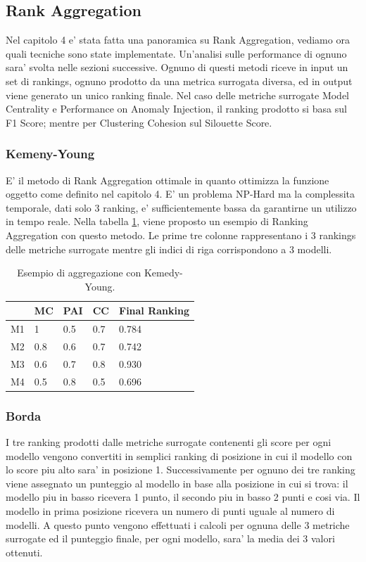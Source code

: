 \subsection{Rank Aggregation}
Nel capitolo 4 e' stata fatta una panoramica su Rank Aggregation, vediamo ora quali tecniche sono state implementate. Un'analisi sulle performance di ognuno sara' svolta nelle sezioni successive.
Ognuno di questi metodi riceve in input un set di rankings, ognuno prodotto da una metrica surrogata diversa, ed in output viene generato un unico ranking finale.
Nel caso delle metriche surrogate Model Centrality e Performance on Anomaly Injection, il ranking prodotto si basa sul F1 Score; mentre per Clustering Cohesion sul Silouette Score.
\subsubsection{Kemeny-Young}
E' il metodo di Rank Aggregation ottimale in quanto ottimizza la funzione oggetto come definito nel capitolo 4. E' un problema NP-Hard ma la complessita temporale, dati solo 3 ranking, e' sufficientemente bassa da garantirne un utilizzo in tempo reale. Nella tabella \ref{kemeny-young}, viene proposto un esempio di Ranking Aggregation con questo metodo. Le prime tre colonne rappresentano i 3 rankings delle metriche surrogate mentre gli indici di riga corrispondono a 3 modelli.
\begin{table}
	\centering
	\caption{\label{kemeny-young}Esempio di aggregazione con Kemedy-Young.}
	\begin{tabular}{|l|l|l|l|l|} 
		\hline
		   & MC  & PAI & CC  & Final Ranking \\ 
		\hline
		M1 & 1   & 0.5 & 0.7 & 0.784         \\ 
		\hline
		M2 & 0.8 & 0.6 & 0.7 & 0.742         \\ 
		\hline
		M3 & 0.6 & 0.7 & 0.8 & 0.930         \\ 
		\hline
		M4 & 0.5 & 0.8 & 0.5 & 0.696         \\
		\hline
	\end{tabular}
\end{table}

\subsubsection{Borda}
I tre ranking prodotti dalle metriche surrogate contenenti gli score per ogni modello vengono convertiti in semplici ranking di posizione in cui il modello con lo score piu alto sara' in posizione 1. Successivamente per ognuno dei tre ranking viene assegnato un punteggio al modello in base alla posizione in cui si trova: il modello piu in basso ricevera 1 punto, il secondo piu in basso 2 punti e cosi via. Il modello in prima posizione ricevera un numero di punti uguale al numero di modelli. A questo punto vengono effettuati i calcoli per ognuna delle 3 metriche surrogate ed il punteggio finale, per ogni modello, sara' la media dei 3 valori ottenuti.

